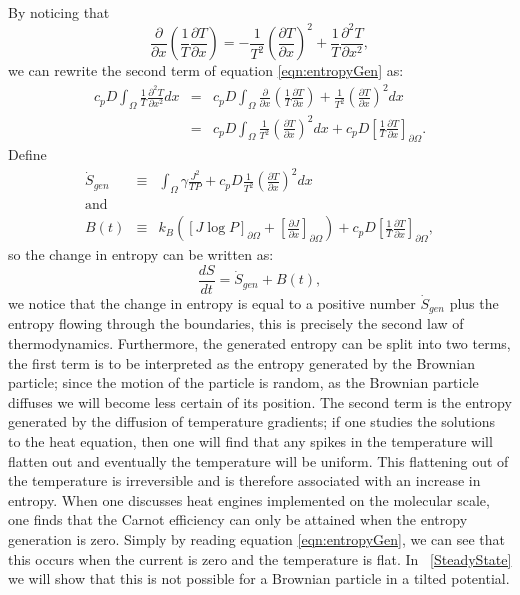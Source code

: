 By noticing that
\begin{equation}
\frac{\partial}{\partial x} \left(\frac{1}{T} \frac{\partial T}{\partial x} \right) = -\frac{1}{T^2} \left(\frac{\partial T}{\partial x} \right)^2 + \frac{1}{T} \frac{\partial^2 T}{\partial x^2},
\end{equation}
we can rewrite the second term of equation \ref{eqn:entropyGen} as:
\begin{eqnarray}
c_p D \int_{\Omega} \frac{1}{T} \frac{\partial^2 T}{\partial x^2} dx &=& c_p D \int_{\Omega} \frac{\partial}{\partial x} \left(\frac{1}{T} \frac{\partial T}{\partial x} \right) + \frac{1}{T^2} \left(\frac{\partial T}{\partial x} \right)^2 dx \\
 &=& c_p D \int_{\Omega} \frac{1}{T^2} \left(\frac{\partial T}{\partial x} \right)^2 dx + c_p D\left[\frac{1}{T} \frac{\partial T}{\partial x} \right]_{\partial \Omega}.
\end{eqnarray}
Define
\begin{eqnarray}
\dot{S}_{gen} &\equiv& \int_{\Omega} \gamma \frac{J^2}{T P} + c_p D \frac{1}{T^2} \left(\frac{\partial T}{\partial x} \right)^2 dx \label{eqn:entropyGen} \\
\text{and} \nonumber \\
B(t) &\equiv& k_B \left( [J \log P]_{\partial \Omega} + \left[\frac{\partial J}{\partial x}\right]_{\partial \Omega} \right) + c_p D\left[\frac{1}{T} \frac{\partial T}{\partial x} \right]_{\partial \Omega},
\end{eqnarray}
so the change in entropy can be written as:
\begin{equation}
\frac{d S}{d t} = \dot{S}_{gen} + B(t),
\end{equation}
we notice that the change in entropy is equal to a positive number $\dot{S}_{gen}$ plus the entropy flowing through the boundaries, this is precisely the second law of thermodynamics. Furthermore, the generated entropy can be split into two terms, the first term is to be interpreted as the entropy generated by the Brownian particle; since the motion of the particle is random, as the Brownian particle diffuses we will become less certain of its position. The second term is the entropy generated by the diffusion of temperature gradients; if one studies the solutions to the heat equation, then one will find that any spikes in the temperature will flatten out and eventually the temperature will be uniform. This flattening out of the temperature is irreversible and is therefore associated with an increase in entropy. When one discusses heat engines implemented on the molecular scale, one finds that the Carnot efficiency can only be attained when the entropy generation is zero. Simply by reading equation \ref{eqn:entropyGen}, we can see that this occurs when the current is zero and the temperature is flat. In ~\autoref{SteadyState} we will show that this is not possible for a Brownian particle in a tilted potential. 

